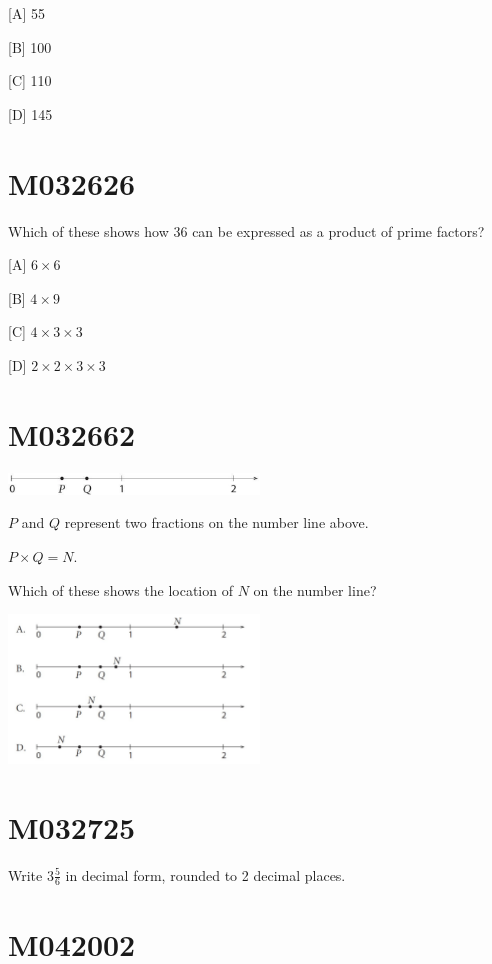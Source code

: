 \documentclass[12pt]{article}
\begin{document}
[A] 55

[B] 100

[C] 110

[D] 145

\newpage
\section*{M032626}

Which of these shows how 36 can be expressed as a product of prime factors?

[A] $6 \times 6$

[B] $4 \times 9$

[C] $4 \times 3 \times 3$

[D] $2 \times 2 \times 3 \times 3$

\newpage
\section*{M032662}

\includegraphics[max width=0.5\textwidth]{2024_02_20_828ebc9d68bcc1fbb223g-06(1)}

$P$ and $Q$ represent two fractions on the number line above.

$P \times Q=N$.

Which of these shows the location of $N$ on the number line?

\includegraphics[max width=0.5\textwidth]{2024_02_20_828ebc9d68bcc1fbb223g-06(2)}

\newpage
\section*{M032725}

Write $3 \frac{5}{6}$ in decimal form, rounded to 2 decimal places.

\newpage
\section*{M042002}
\end{document}
